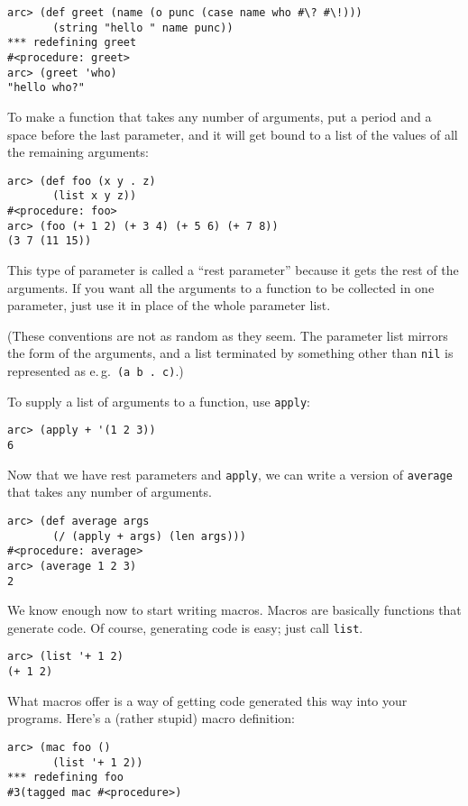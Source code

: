 \documentclass[a4paper,12pt]{book}
\begin{document}
\begin{verbatim}
arc> (def greet (name (o punc (case name who #\? #\!)))
       (string "hello " name punc)) 
*** redefining greet
#<procedure: greet>
arc> (greet 'who)
"hello who?"
\end{verbatim}

To make a function that takes any number of arguments, put a period
and a space before the last parameter, and it will get bound to a
list of the values of all the remaining arguments:

\begin{verbatim}
arc> (def foo (x y . z) 
       (list x y z))
#<procedure: foo>
arc> (foo (+ 1 2) (+ 3 4) (+ 5 6) (+ 7 8))
(3 7 (11 15))
\end{verbatim}

This type of parameter is called a ``rest parameter'' because it gets
the rest of the arguments.  If you want all the arguments to a
function to be collected in one parameter, just use it in place of
the whole parameter list.

(These conventions are not as random as they seem.  The parameter
list mirrors the form of the arguments, and a list terminated by
something other than \verb|nil| is represented as e.\,g.\ \verb|(a b . c)|.)

To supply a list of arguments to a function, use \verb|apply|:

\begin{verbatim}
arc> (apply + '(1 2 3))
6
\end{verbatim}

Now that we have rest parameters and \verb|apply|, we can write a version
of \verb|average| that takes any number of arguments.

\begin{verbatim}
arc> (def average args 
       (/ (apply + args) (len args)))
#<procedure: average>
arc> (average 1 2 3)
2
\end{verbatim}

We know enough now to start writing macros.  Macros are basically
functions that generate code.  Of course, generating code is easy;
just call \verb|list|.

\begin{verbatim}
arc> (list '+ 1 2)
(+ 1 2)
\end{verbatim}

What macros offer is a way of getting code generated this way into
your programs.  Here's a (rather stupid) macro definition:

\begin{verbatim}
arc> (mac foo () 
       (list '+ 1 2))
*** redefining foo
#3(tagged mac #<procedure>)
\end{verbatim}
\end{document}
